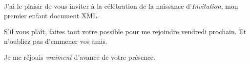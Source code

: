 \documentclass[francais]{article}
\begin{document}
\begin{Front}
\end{Front}
\begin{Body}
\par
J'ai le plaisir de vous inviter à la célébration
de la naissance d'\emph{Invitation}, mon
premier enfant document XML.
\par
S'il vous plaît, faites tout votre possible pour me rejoindre 
vendredi prochain. Et n'oubliez pas d'emmener vos amis.
\par
Je me réjouis \emph{vraiment} d'avance de votre présence.
\end{Body}
\begin{Back}
\end{Back}
\end{document}
